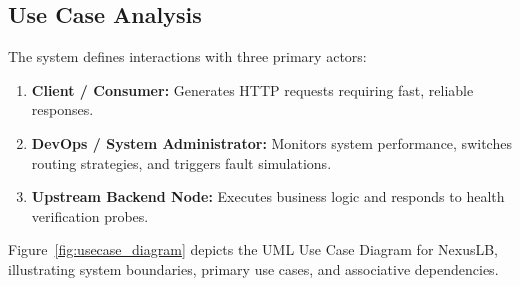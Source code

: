 \documentclass[12pt,openany]{report}
\begin{document}
\subsection{Use Case Analysis}

The system defines interactions with three primary actors:
\begin{enumerate}
  \item \textbf{Client / Consumer:} Generates HTTP requests requiring fast, reliable responses.
  \item \textbf{DevOps / System Administrator:} Monitors system performance, switches routing strategies, and triggers fault simulations.
  \item \textbf{Upstream Backend Node:} Executes business logic and responds to health verification probes.
\end{enumerate}

Figure~\ref{fig:usecase_diagram} depicts the UML Use Case Diagram for NexusLB, illustrating system boundaries, primary use cases, and associative dependencies.
\end{document}
